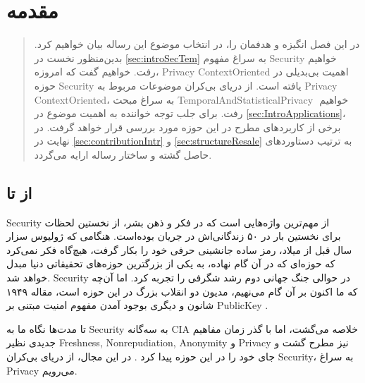 \chapter{مقدمه}
\label{chap:introduction}
\begin{abstract}
در این فصل  انگیزه‌ و هدفمان را، در انتخاب موضوع این رساله بیان خواهیم کرد. بدین‌منظور  نخست در
\autoref{sec:introSecTem}
به سراغ مفهوم \gls{Security} خواهیم رفت. خواهیم گفت که امروزه،
\gls{Privacy} \gls{ContextOriented}
اهمیت بی‌بدیلی در حوزه \gls{Security} یافته است. از دریای بی‌کران موضوعات مربوط به 
\gls{Privacy} \gls{ContextOriented}،
به سراغ  مبحث
 ‎\gls{TemporalAndStatisticalPrivacy} ‎ 
خواهیم رفت. برای جلب توجه خواننده به اهمیت موضوع در 
\autoref{sec:IntroApplications}،
برخی از کاربردهای مطرح در این حوزه مورد بررسی قرار خواهد گرفت. در نهایت در 
\autoref{sec:contributionIntr} و \autoref{sec:structureResale}
به ترتیب دستاوردهای حاصل گشته و ساختار رساله ارایه می‌گردد. 
\end{abstract}

\section{از  تا }
\label{sec:introSecTem} 
\gls{Security}
از مهم‌ترین واژه‌هایی است که در فکر و ذهن بشر، از نخستین لحظات زندگانی‌اش در جریان بوده‌است. هنگامی که  ژولیوس سزار‎‎‎
برای نخستین بار در ۵۰ سال قبل از میلاد، رمز ساده جانشینی حرفی خود را بکار گرفت، هیچ‌گاه فکر نمی‌کرد که حوزه‌ای که در آن گام نهاده، به یکی از بزرگترین حوزه‌های تحقیقاتی دنیا مبدل خواهد شد. 
\gls{Security}
در حوالی جنگ جهانی دوم رشد شگرفی را تجربه کرد. اما آن‌چه که ما اکنون بر  آن گام می‌نهیم، مدیون دو انقلاب  بزرگ در این حوزه است، مقاله ۱۹۴۹ شانون \cite{Shannon1949Communication}
 و دیگری بوجود آمدن مفهوم امنیت مبتنی بر 
\gls{PublicKey} \cite{menezes1996handbook}.

تا مدت‌ها نگاه ما به 
\gls{Security}
به سه‌گانه
\gls{CIA}
خلاصه می‌گشت، اما با گذر زمان مفاهیم جدیدی نظیر
\gls{Freshness}, \gls{Nonrepudiation}, \gls{Anonymity} و \gls{Privacy}
نیز مطرح گشت و جای خود را در این حوزه پیدا کرد
\cite{menezes1996handbook}.
در این مجال، از دریای بی‌کران
\gls{Security}، به سراغ \gls{Privacy}
می‌رویم. 

